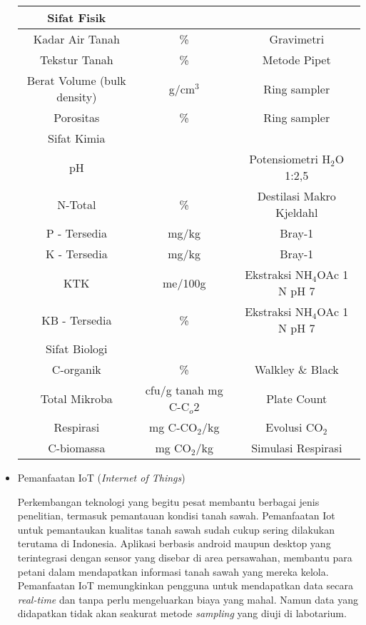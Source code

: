 \begin{itemize}
\begin{table}[H]
\begin{tabular}{ccc}
		\midrule
		Sifat Fisik\\
		\hline
		Kadar Air Tanah & \% & Gravimetri\\
		Tekstur Tanah & \% & Metode Pipet\\
		Berat Volume (bulk density) & g/cm$^3$ & Ring sampler \\
		Porositas & \% & Ring sampler\\
		\hline
		Sifat Kimia\\
		\hline
		pH &  & Potensiometri H$_2$O 1:2,5\\
		N-Total & \% & Destilasi Makro Kjeldahl\\
		P - Tersedia & mg/kg & Bray-1\\
		K - Tersedia & mg/kg & Bray-1\\
		KTK & me/100g & Ekstraksi NH$_4$OAc 1 N pH 7\\
		KB - Tersedia & \% & Ekstraksi NH$_4$OAc 1 N pH 7\\
        \hline
		Sifat Biologi\\
		\hline
		C-organik & \% & Walkley \& Black\\
		Total Mikroba & cfu/g tanah mg C-C$_o2$ & Plate Count\\
		Respirasi & mg C-CO$_2$/kg & Evolusi CO$_2$\\
		C-biomassa & mg CO$_2$/kg & Simulasi Respirasi\\
		

		\bottomrule
		
	\end{tabular} 
\end{table}
    
    \item Pemanfaatan IoT (\textit{Internet of Things})
    
    Perkembangan teknologi yang begitu pesat membantu berbagai jenis penelitian, termasuk pemantauan kondisi tanah sawah. Pemanfaatan Iot untuk pemantaukan kualitas tanah sawah sudah cukup sering dilakukan terutama di Indonesia. Aplikasi berbasis android maupun desktop yang terintegrasi dengan sensor yang disebar di area persawahan, membantu para petani dalam mendapatkan informasi tanah sawah yang mereka kelola. Pemanfaatan IoT memungkinkan pengguna untuk mendapatkan data secara \textit{real-time} dan tanpa perlu mengeluarkan biaya yang mahal. Namun data yang didapatkan tidak akan seakurat metode \textit{sampling} yang diuji di labotarium.
    
\end{itemize}

